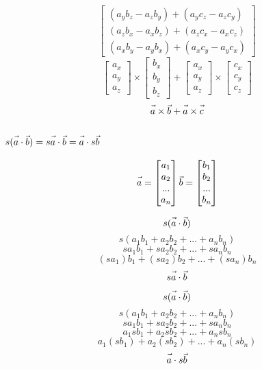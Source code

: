 \documentclass{article}
\newcommand{\fvec}[1]{\vec{\vphantom{A}#1}}
\begin{document}
$$ \begin{bmatrix}
    (a_{y}b_{z} - a_{z}b_{y}) + (a_{y}c_{z} - a_{z}c_{y}) \\
    (a_{z}b_{x} - a_{x}b_{z}) + (a_{z}c_{x} - a_{x}c_{z}) \\
    (a_{x}b_{y} - a_{y}b_{x}) + (a_{x}c_{y} - a_{y}c_{x})
\end{bmatrix} $$
$$ \begin{bmatrix} a_{x} \\ a_{y} \\ a_{z} \end{bmatrix} \times
    \begin{bmatrix} b_{x} \\ b_{y} \\ b_{z} \end{bmatrix} + 
    \begin{bmatrix} a_{x} \\ a_{y} \\ a_{z} \end{bmatrix} \times
    \begin{bmatrix} c_{x} \\ c_{y} \\ c_{z} \end{bmatrix} $$
$$ \fvec{a} \times \fvec{b} + \fvec{a} \times \fvec{c} $$

\subsection{$ s(\fvec{a} \cdot \fvec{b}) = s\fvec{a} \cdot \fvec{b} = \fvec{a} \cdot s\fvec{b} $}
$$ \fvec{a} = \begin{bmatrix}a_1 \\ a_2 \\ ... \\ a_n\end{bmatrix}
    \fvec{b} = \begin{bmatrix}b_1 \\ b_2 \\ ... \\ b_n\end{bmatrix} $$

\noindent\begin{minipage}{.5\linewidth}
    $$ s(\fvec{a} \cdot \fvec{b}) $$
    $$ s(a_1 b_1 + a_2 b_2 + ... + a_n b_n) $$
    $$ s a_1 b_1 + s a_2 b_2 + ... + s a_n b_n $$
    $$ (s a_1) b_1 + (s a_2) b_2 + ... + (s a_n) b_n $$
    $$ s\fvec{a} \cdot \fvec{b} $$
\end{minipage}%
\hfill
\begin{minipage}{.5\linewidth}
    $$ s(\fvec{a} \cdot \fvec{b}) $$
    $$ s(a_1 b_1 + a_2 b_2 + ... + a_n b_n) $$
    $$ s a_1 b_1 + s a_2 b_2 + ... + s a_n b_n $$
    $$ a_1 s b_1 + a_2 s b_2 + ... + a_n s b_n $$
    $$ a_1 (s b_1) + a_2 (s b_2) + ... + a_n (s b_n) $$
    $$ \fvec{a} \cdot s\fvec{b} $$
\end{minipage}%
\end{document}
